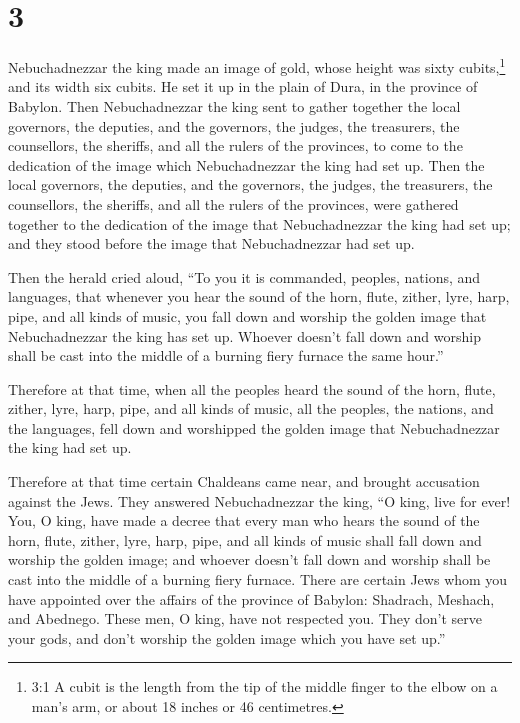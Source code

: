 \hypertarget{section-2}{%
\section{3}\label{section-2}}

 Nebuchadnezzar the king made an image of gold, whose height
was sixty cubits,\footnote{3:1 A cubit is the length from the tip of the
  middle finger to the elbow on a man's arm, or about 18 inches or 46
  centimetres.} and its width six cubits. He set it up in the plain of
Dura, in the province of Babylon.  Then Nebuchadnezzar the
king sent to gather together the local governors, the deputies, and the
governors, the judges, the treasurers, the counsellors, the sheriffs,
and all the rulers of the provinces, to come to the dedication of the
image which Nebuchadnezzar the king had set up.  Then the
local governors, the deputies, and the governors, the judges, the
treasurers, the counsellors, the sheriffs, and all the rulers of the
provinces, were gathered together to the dedication of the image that
Nebuchadnezzar the king had set up; and they stood before the image that
Nebuchadnezzar had set up.

 Then the herald cried aloud, ``To you it is commanded,
peoples, nations, and languages,  that whenever you hear the
sound of the horn, flute, zither, lyre, harp, pipe, and all kinds of
music, you fall down and worship the golden image that Nebuchadnezzar
the king has set up.  Whoever doesn't fall down and worship
shall be cast into the middle of a burning fiery furnace the same
hour.''

 Therefore at that time, when all the peoples heard the
sound of the horn, flute, zither, lyre, harp, pipe, and all kinds of
music, all the peoples, the nations, and the languages, fell down and
worshipped the golden image that Nebuchadnezzar the king had set up.

 Therefore at that time certain Chaldeans came near, and
brought accusation against the Jews.  They answered
Nebuchadnezzar the king, ``O king, live for ever!  You, O
king, have made a decree that every man who hears the sound of the horn,
flute, zither, lyre, harp, pipe, and all kinds of music shall fall down
and worship the golden image;  and whoever doesn't fall
down and worship shall be cast into the middle of a burning fiery
furnace.  There are certain Jews whom you have appointed
over the affairs of the province of Babylon: Shadrach, Meshach, and
Abednego. These men, O king, have not respected you. They don't serve
your gods, and don't worship the golden image which you have set up.''

